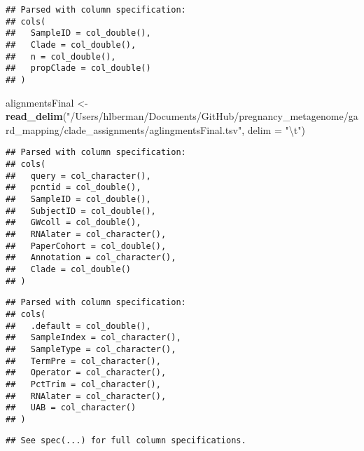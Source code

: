 \documentclass[]{article}
\newenvironment{Shaded}{\begin{snugshade}}{\end{snugshade}}
\newcommand{\KeywordTok}[1]{\textcolor[rgb]{0.13,0.29,0.53}{\textbf{{#1}}}}
\newcommand{\DataTypeTok}[1]{\textcolor[rgb]{0.13,0.29,0.53}{{#1}}}
\newcommand{\CharTok}[1]{\textcolor[rgb]{0.31,0.60,0.02}{{#1}}}
\newcommand{\StringTok}[1]{\textcolor[rgb]{0.31,0.60,0.02}{{#1}}}
\newcommand{\NormalTok}[1]{{#1}}
\begin{document}
\begin{verbatim}
## Parsed with column specification:
## cols(
##   SampleID = col_double(),
##   Clade = col_double(),
##   n = col_double(),
##   propClade = col_double()
## )
\end{verbatim}

\begin{Shaded}
\begin{Highlighting}[]
\NormalTok{alignmentsFinal <-}\StringTok{ }\KeywordTok{read_delim}\NormalTok{(}\StringTok{"/Users/hlberman/Documents/GitHub/pregnancy_metagenome/gard_mapping/clade_assignments/aglingmentsFinal.tsv"}\NormalTok{, }\DataTypeTok{delim =} \StringTok{"}\CharTok{\textbackslash{}t}\StringTok{"}\NormalTok{)}
\end{Highlighting}
\end{Shaded}

\begin{verbatim}
## Parsed with column specification:
## cols(
##   query = col_character(),
##   pcntid = col_double(),
##   SampleID = col_double(),
##   SubjectID = col_double(),
##   GWcoll = col_double(),
##   RNAlater = col_character(),
##   PaperCohort = col_double(),
##   Annotation = col_character(),
##   Clade = col_double()
## )
\end{verbatim}

\begin{Shaded}
\end{Shaded}

\begin{verbatim}
## Parsed with column specification:
## cols(
##   .default = col_double(),
##   SampleIndex = col_character(),
##   SampleType = col_character(),
##   TermPre = col_character(),
##   Operator = col_character(),
##   PctTrim = col_character(),
##   RNAlater = col_character(),
##   UAB = col_character()
## )
\end{verbatim}

\begin{verbatim}
## See spec(...) for full column specifications.
\end{verbatim}
\end{document}
